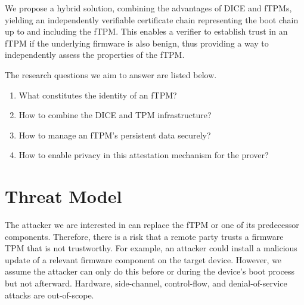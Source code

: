 
We propose a hybrid solution, combining the advantages of \ac{DICE} and \acp{fTPM}, yielding an independently verifiable certificate chain representing the boot chain up to and including the \ac{fTPM}.
This enables a verifier to establish trust in an \ac{fTPM} if the underlying firmware is also benign, thus providing a way to independently assess the properties of the \ac{fTPM}.


The research questions we aim to answer are listed below.
\begin{enumerate}[label=\textbf{RQ-\arabic*}]
  \item What constitutes the identity of an fTPM\@?\label{rq:1-tpm-identity} %
  \item How to combine the DICE and TPM infrastructure?\label{rq:2-combine-infrastructure} %
  \item How to manage an fTPM's persistent data securely?\label{rq:3-secure-data} %
  \item How to enable privacy in this attestation mechanism for the prover?\label{rq:4-privacy}
\end{enumerate}



\section{Threat Model}



The attacker we are interested in can replace the fTPM or one of its predecessor components.
Therefore, there is a risk that a remote party trusts a firmware TPM that is not trustworthy.
For example, an attacker could install a malicious update of a relevant firmware component on the target device.
However, we assume the attacker can only do this before or during the device's boot process but not afterward.
Hardware, side-channel, control-flow, and denial-of-service attacks are out-of-scope.

